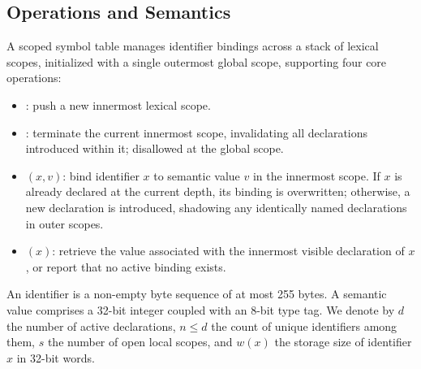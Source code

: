 \subsection{Operations and Semantics}
A scoped symbol table manages identifier bindings across a stack of lexical scopes, initialized with a single outermost global scope, supporting four core operations:
\begin{itemize}
\item {}: push a new innermost lexical scope.
\item {}: terminate the current innermost scope, invalidating all declarations introduced within it; disallowed at the global scope.
\item {}$(x, v)$: bind identifier $x$ to semantic value $v$ in the innermost scope. If $x$ is already declared at the current depth, its binding is overwritten; otherwise, a new declaration is introduced, shadowing any identically named declarations in outer scopes.
\item {}$(x)$: retrieve the value associated with the innermost visible declaration of $x$, or report that no active binding exists.
\end{itemize}
An identifier is a non-empty byte sequence of at most 255 bytes. A semantic value comprises a 32-bit integer coupled with an 8-bit type tag. We denote by $d$ the number of active declarations, $n \le d$ the count of unique identifiers among them, $s$ the number of open local scopes, and $w(x)$ the storage size of identifier $x$ in 32-bit words.

